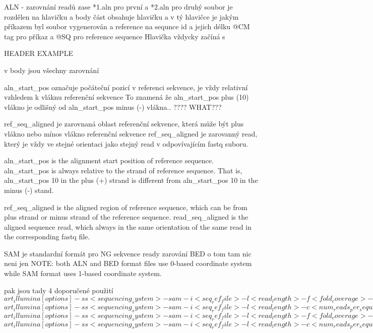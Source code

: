 \documentclass[czech,DP]{thesiskiv}
\begin{document}
ALN - zarovnání readů
zase *1.aln pro první a *2.aln pro druhý
soubor je rozdělen na hlavičku a body část
obsahuje hlavičku a v tý hlavičce je jakým příkazem byl soubor vygenerován a reference na sequnce id a jejich délku
@CM tag pro příkaz a
@SQ pro reference sequence
Hlavička vždycky začíná s 

		HEADER EXAMPLE

		
v body jsou všechny zarovnání 
	    
	    aln\_start\_pos označuje počáteční pozicí v referenci sekvence, je vždy relativní vzhledem k vláknu referenční sekvence
	    To znamená že aln\_start\_pos plus (10) vlákno je odlišný od  aln\_start\_pos minus (-) vlákna.. ???? WHAT???
	    
		ref\_seq\_aligned je zarovnaná oblast referenční sekvence, která může být plus vlákno nebo mínos vlákno referenční sekvence
		ref\_seq\_aligned je zarovanný read, který je vždy ve stejné orientaci jako stejný read v odpovívajícím fastq suboru.  
		
		
			    
	    
	       	
		aln\_start\_pos is the alignment start position of reference sequence. aln\_start\_pos is always relative to the strand of reference sequence. That is, aln\_start\_pos 10 in the plus (+) strand is different from aln\_start\_pos 10 in the minus (‐) stand.  
	
		ref\_seq\_aligned is the aligned region of reference sequence, which can be from plus strand or minus strand of the reference sequence. 
		read\_seq\_aligned is the aligned sequence read, which always in the same orientation of the same read in the corresponding fastq file. 

SAM je standardní formát pro NG sekvence ready zarování
BED o tom tam nic neni jen 
NOTE: both ALN and BED format files use 0-based coordinate system while SAM format uses 1-based coordinate system.

pak jsou tady 4 doporučené použití
$art_illumina [options] -ss <sequencing_system> -sam -i <seq_ref_file> -l <read_length> -f <fold_coverage> -o <outfile_prefix>$
$art_illumina [options] -ss <sequencing_system> -sam -i <seq_ref_file> -l <read_length> -c <num_reads_per_sequence> -o <outfile_prefix>$
$art_illumina [options] -ss <sequencing_system> -sam -i <seq_ref_file> -l <read_length> -f <fold_coverage> -m <mean_fragsize> -s <std_fragsize> -o <outfile_prefix>$
$art_illumina [options] -ss <sequencing_system> -sam -i <seq_ref_file> -l <read_length> -c <num_reads_per_sequence> -m <mean_fragsize> -s <std_fragsize> -o <outfile_prefix>$
\end{document}
